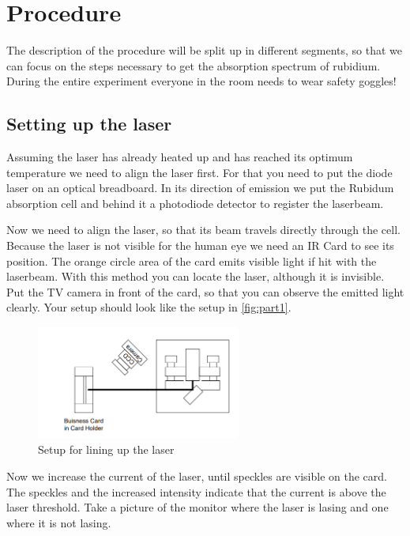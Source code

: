 \section{Procedure}
\label{sec:Procedure}

The description of the procedure will be split up in different segments, so that we can focus on the steps necessary to get the absorption spectrum of rubidium.
During the entire experiment everyone in the room needs to wear safety goggles!

\subsection{Setting up the laser}
\label{ssec:exe1}

Assuming the laser has already heated up and has reached its optimum temperature we need to align the laser first.
For that you need to put the diode laser on an optical breadboard.
In its direction of emission we put the Rubidum absorption cell and behind it a photodiode detector to register the laserbeam.

Now we need to align the laser, so that its beam travels directly through the cell.
Because the laser is not visible for the human eye we need an IR Card to see its position. 
The orange circle area of the card emits visible light if hit with the laserbeam. 
With this method you can locate the laser, although it is invisible.
Put the TV camera in front of the card, so that you can observe the emitted light clearly.
Your setup should look like the setup in \autoref{fig:part1}.

\begin{figure}
    \centering
    \includegraphics[width=0.6\textwidth]{images/part1.png}
    \caption{Setup for lining up the laser \cite{V60}}
    \label{fig:part1}
\end{figure}

Now we increase the current of the laser, until speckles are visible on the card. 
The speckles and the increased intensity indicate that the current is above the laser threshold. 
Take a picture of the monitor where the laser is lasing and one where it is not lasing.

